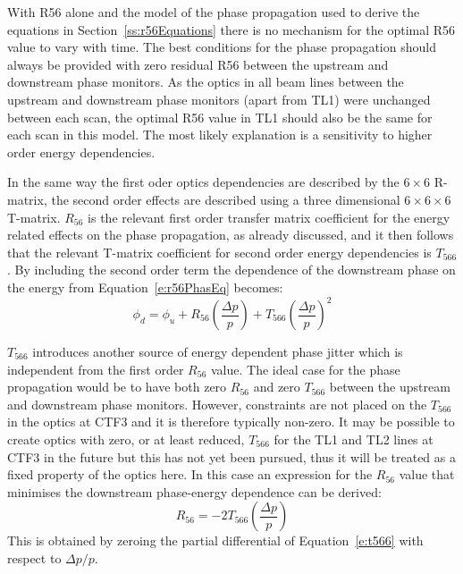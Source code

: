 With R56 alone and the model of the phase propagation used to derive the equations in Section~\ref{ss:r56Equations} there is no mechanism for the optimal R56 value to vary with time. The best conditions for the phase propagation should always be provided with zero residual R56 between the upstream and downstream phase monitors. As the optics in all beam lines between the upstream and downstream phase monitors (apart from TL1) were unchanged between each scan, the optimal R56 value in TL1 should also be the same for each scan in this model. The most likely explanation is a sensitivity to higher order energy dependencies.


In the same way the first oder optics dependencies are described by the \(6 \times 6\) R-matrix, the second order effects are described using a three dimensional \(6 \times 6 \times 6\) T-matrix. \(R_{56}\) is the relevant first order transfer matrix coefficient for the energy related effects on the phase propagation, as already discussed, and it then follows that the relevant T-matrix coefficient for second order energy dependencies is \(T_{566}\). By including the second order term the dependence of the downstream phase on the energy from Equation~\ref{e:r56PhasEq} becomes:
\begin{equation}
\phi_d = \phi_u + R_{56}\left(\frac{\Delta p}{p}\right) + T_{566}\left(\frac{\Delta p}{p}\right)^2
\label{e:t566}
\end{equation}

\(T_{566}\) introduces another source of energy dependent phase jitter which is independent from the first order \(R_{56}\) value. The ideal case for the phase propagation would be to have both zero \(R_{56}\) and zero \(T_{566}\) between the upstream and downstream phase monitors. However, constraints are not placed on the \(T_{566}\) in the optics at CTF3 and it is therefore typically non-zero. It may be possible to create optics with zero, or at least reduced, \(T_{566}\) for the TL1 and TL2 lines at CTF3 in the future but this has not yet been pursued, thus it will be treated as a fixed property of the optics here. In this case an expression for the \(R_{56}\) value that minimises the downstream phase-energy dependence can be derived:
\begin{equation}
R_{56} = -2T_{566} \left(\frac{\Delta p}{p}\right)
\label{e:r56t566dep}
\end{equation}
This is obtained by zeroing the partial differential of Equation~\ref{e:t566} with respect to \(\Delta p/p\).

